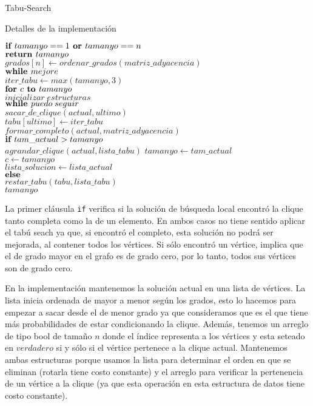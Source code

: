 \begin{section}{Tabu-Search}
\begin{subsection}{Detalles de la implementación}
			\begin{pseudo}
				\tab $\textbf{if } tamanyo==1 \textbf{ or } tamanyo==n$\\
				\tab \tab $\textbf{return } tamanyo$\\
				\tab $grados[n] \leftarrow ordenar\_grados(matriz\_adyacencia)$\\
				\tab $\textbf{while } mejore$\\
				\tab \tab $iter\_tabu \leftarrow max(tamanyo,3)$\\
				\tab \tab $\textbf{for } c \textbf{ to } tamanyo$\\
				\tab \tab \tab $inicializar\;estructuras$\\
				\tab \tab \tab $\textbf{while } puedo\;seguir$\\
				\tab \tab \tab \tab $sacar\_de\_clique(actual,ultimo)$\\
				\tab \tab \tab \tab $tabu[ultimo] \leftarrow iter\_tabu$\\
				\tab \tab \tab \tab $formar\_completo(actual,matriz\_adyacencia)$\\
				\tab \tab \tab \tab $\textbf{if } tam\_actual>tamanyo$\\
				\tab \tab \tab \tab \tab $agrandar\_clique(actual,lista\_tabu)$
				\tab \tab \tab \tab \tab $tamanyo \leftarrow tam\_actual$\\
				\tab \tab \tab \tab \tab $c \leftarrow tamanyo$\\
				\tab \tab \tab \tab \tab $lista\_solucion \leftarrow lista\_actual$\\
				\tab \tab \tab \tab $\textbf{else }$\\
				\tab \tab \tab \tab \tab $restar\_tabu(tabu,lista\_tabu)$\\
				\RET $tamanyo$\\
			\end{pseudo}

		La primer cláusula \texttt{if} verifica si la solución de búsqueda local encontró la clique tanto completa como la de un elemento. En ambos casos no tiene sentido aplicar el tabú seach ya que, si encontró el completo, esta solución no podrá ser mejorada, al contener todos los vértices. Si sólo encontró un vértice, implica que el de grado mayor en el grafo es de grado cero, por lo tanto, todos sus vértices son de grado cero. 

		En la implementación mantenemos la solución actual en una lista de vértices. La lista inicia ordenada de mayor a menor según los grados, esto lo hacemos para empezar a sacar desde el de menor grado ya que consideramos que es el que tiene más probabilidades de estar condicionando la clique. Además, tenemos un arreglo de tipo bool de tamaño $n$ donde el índice representa a los vértices y esta seteado en $verdadero$ si y sólo si el vértice pertenece a la clique actual. Mantenemos ambas estructuras porque usamos la lista para determinar el orden en que se eliminan (rotarla tiene costo constante) y el arreglo para verificar la pertenencia de un vértice a la clique (ya que esta operación en esta estructura de datos tiene costo constante).


\end{subsection}
\end{section}

